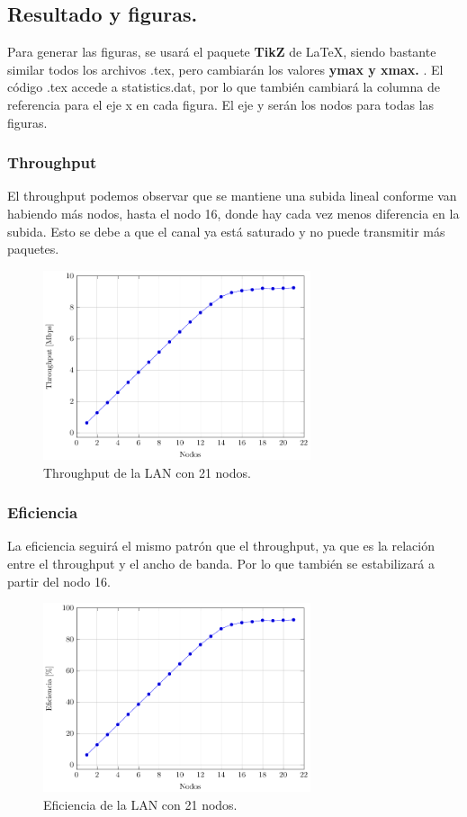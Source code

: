 \documentclass{article}
\begin{document}
\subsection{Resultado y figuras.}

Para generar las figuras, se usará el paquete \textbf{TikZ} de \LaTeX, siendo bastante similar todos los archivos .tex, pero cambiarán los valores \textbf{ymax y xmax. }. El código .tex accede a statistics.dat, por lo que también cambiará la columna de referencia para el eje x en cada figura. El eje y serán los nodos para todas las figuras.
\newpage
\subsubsection{Throughput}

El throughput podemos observar que se mantiene una subida lineal conforme van habiendo más nodos, hasta el nodo 16, donde hay cada vez menos diferencia en la subida. Esto se debe a que el canal ya está saturado y no puede transmitir más paquetes.

\begin{figure}[h]
	\centering
	\includegraphics[width=0.7\textwidth]{src/Throughput.pdf}
	\caption{Throughput de la LAN con 21 nodos.}
\end{figure}

\subsubsection{Eficiencia}
La eficiencia seguirá el mismo patrón que el throughput, ya que es la relación entre el throughput y el ancho de banda. Por lo que también se estabilizará a partir del nodo 16.
\begin{figure}[h]
    \centering
    \includegraphics[width=0.7\textwidth]{src/Efficiency.pdf}
    \caption{Eficiencia de la LAN con 21 nodos.}
\end{figure}
\newpage
\end{document}
